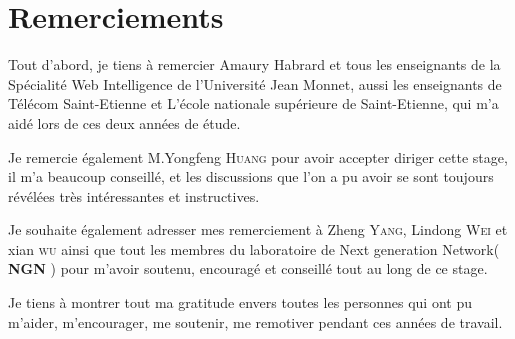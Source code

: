 \thispagestyle{empty}
\section*{Remerciements}

Tout d’abord, je tiens à remercier Amaury Habrard et tous les enseignants de la Spécialité Web Intelligence de l’Université Jean Monnet, aussi les enseignants de Télécom Saint-Etienne et L'école nationale supérieure de Saint-Etienne, qui m’a aidé lors de ces deux années de étude.


Je remercie également M.Yongfeng \textsc{Huang} pour avoir accepter diriger cette stage, il m’a beaucoup conseillé, et les discussions que l’on a pu avoir se sont toujours révélées très intéressantes et instructives.


Je souhaite également adresser mes remerciement à Zheng \textsc{Yang}, Lindong \textsc{Wei} et xian \textsc{wu} ainsi que tout les membres du laboratoire de Next generation Network( \textbf{NGN} ) pour m’avoir soutenu, encouragé et conseillé tout au long de ce stage.


Je tiens à montrer tout ma gratitude envers toutes les personnes qui ont pu m’aider, m’encourager, me soutenir, me remotiver pendant ces années de travail.